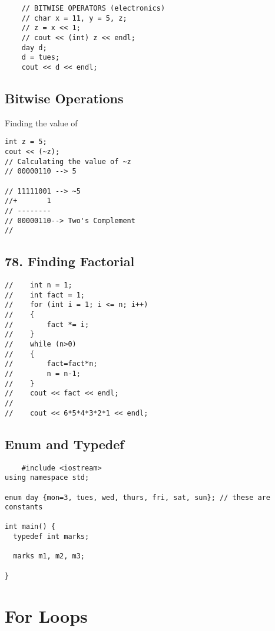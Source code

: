 \documentclass[a4paper,12pt]{book}
\begin{document}
\begin{lstlisting}
    // BITWISE OPERATORS (electronics)
    // char x = 11, y = 5, z;
    // z = x << 1; 
    // cout << (int) z << endl;
    day d;
    d = tues;
    cout << d << endl;
\end{lstlisting}

\section{Bitwise Operations}
Finding the value of ~
\begin{lstlisting}
int z = 5;
cout << (~z);
// Calculating the value of ~z
// 00000110 --> 5

// 11111001 --> ~5
//+       1
// --------
// 00000110--> Two's Complement
//

\end{lstlisting} 

\section{78.  Finding Factorial}

\begin{lstlisting}
//    int n = 1;
//    int fact = 1;
//    for (int i = 1; i <= n; i++)
//    {
//        fact *= i;
//    }
//    while (n>0)
//    {
//        fact=fact*n;
//        n = n-1;
//    }
//    cout << fact << endl;
//
//    cout << 6*5*4*3*2*1 << endl;

\end{lstlisting}

 \section{Enum and Typedef}
 
\begin{lstlisting}
    #include <iostream>
using namespace std;

enum day {mon=3, tues, wed, thurs, fri, sat, sun}; // these are constants

int main() { 
  typedef int marks;

  marks m1, m2, m3;

}

\end{lstlisting}





\chapter{For Loops}
\end{document}
